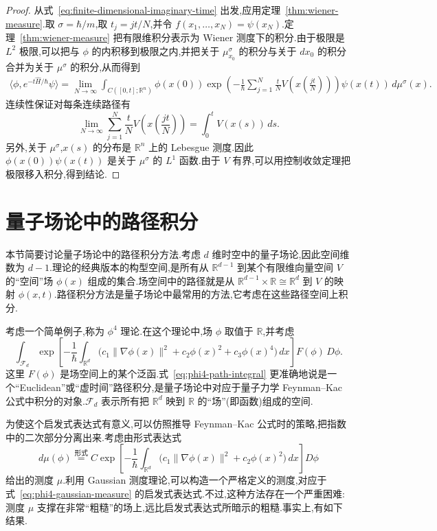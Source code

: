\begin{proof}
从式~\eqref{eq:finite-dimensional-imaginary-time} 出发,应用定理~\ref{thm:wiener-measure}.取 $\sigma=\hbar/m$,取 $t_j=jt/N$,并令 $f(x_1,\ldots,x_N)=\psi(x_N)$.定理~\ref{thm:wiener-measure} 把有限维积分表示为 Wiener 测度下的积分.由于极限是 $L^2$ 极限,可以把与 $\phi$ 的内积移到极限之内,并把关于 $\mu_{x_0}^{\sigma}$ 的积分与关于 $dx_0$ 的积分合并为关于 $\mu^\sigma$ 的积分,从而得到
\[
\begin{aligned}
 \langle\phi,e^{-t\widehat H/\hbar}\psi\rangle
 =\lim_{N\to\infty}\int_{C([0,t];\mathbb R^n)}
 \phi(x(0))
 \exp\left(-\frac1\hbar\sum_{j=1}^N\frac tN
 V\left(x\left(\frac{jt}{N}\right)\right)\right)
 \psi(x(t))\,d\mu^\sigma(x).\label{eq:integrated-feynman-kac-limit}
\end{aligned}
\]
连续性保证对每条连续路径有
\[
 \lim_{N\to\infty}\sum_{j=1}^N\frac tN
 V\left(x\left(\frac{jt}{N}\right)\right)
 =\int_0^tV(x(s))\,ds.
\]
另外,关于 $\mu^\sigma$,$x(s)$ 的分布是 $\mathbb R^n$ 上的 Lebesgue 测度.因此 $\phi(x(0))\psi(x(t))$ 是关于 $\mu^\sigma$ 的 $L^1$ 函数.由于 $V$ 有界,可以用控制收敛定理把极限移入积分,得到结论.
\end{proof}

\section{量子场论中的路径积分}
\label{sec:qft-path-integrals}

本节简要讨论量子场论中的路径积分方法.考虑 $d$ 维时空中的量子场论,因此空间维数为 $d-1$.理论的经典版本的构型空间,是所有从 $\mathbb R^{d-1}$ 到某个有限维向量空间 $V$ 的“空间”场 $\phi(x)$ 组成的集合.场空间中的路径就是从 $\mathbb R^{d-1}\times\mathbb R\cong\mathbb R^d$ 到 $V$ 的映射 $\phi(x,t)$.路径积分方法是量子场论中最常用的方法,它考虑在这些路径空间上积分.

考虑一个简单例子,称为 $\phi^4$ 理论.在这个理论中,场 $\phi$ 取值于 $\mathbb R$,并考虑
\[
 \int_{\mathcal F_d}
 \exp\left[-\frac1\hbar\int_{\mathbb R^d}
 \bigl(c_1\|\nabla\phi(x)\|^2+c_2\phi(x)^2+c_3\phi(x)^4\bigr)\,dx\right]
 F(\phi)\,D\phi.\label{eq:phi4-path-integral}
\]
这里 $F(\phi)$ 是场空间上的某个泛函.式~\eqref{eq:phi4-path-integral} 更准确地说是一个“Euclidean”或“虚时间”路径积分,是量子场论中对应于量子力学 Feynman--Kac 公式中积分的对象.$\mathcal F_d$ 表示所有把 $\mathbb R^d$ 映到 $\mathbb R$ 的“场”(即函数)组成的空间.

为使这个启发式表达式有意义,可以仿照推导 Feynman--Kac 公式时的策略,把指数中的二次部分分离出来.考虑由形式表达式
\[
 d\mu(\phi)\overset{\text{形式}}{=}
 C\exp\left[-\frac1\hbar\int_{\mathbb R^d}
 \bigl(c_1\|\nabla\phi(x)\|^2+c_2\phi(x)^2\bigr)\,dx\right]D\phi\label{eq:phi4-gaussian-measure}
\]
给出的测度 $\mu$.利用 Gaussian 测度理论,可以构造一个严格定义的测度,对应于式~\eqref{eq:phi4-gaussian-measure} 的启发式表达式.不过,这种方法存在一个严重困难:测度 $\mu$ 支撑在非常“粗糙”的场上,远比启发式表达式所暗示的粗糙.事实上,有如下结果.


